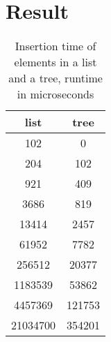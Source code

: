 \documentclass[a4paper,11pt]{article}
\begin{document}
\section{Result}

\begin{table}[h]
\begin{center}
\begin{tabular}{|c|c|}
\textbf{list} & \textbf{tree}\\
\hline
       102 &     0\\
      204 &     102\\
        921 &     409\\
       3686 &     819\\
      13414 &     2457\\
        61952 &     7782\\
      256512 &     20377\\
      1183539 &     53862\\
      4457369 &     121753\\
        21034700 &     354201\\
\end{tabular}
\caption{Insertion time of elements in a list and a tree, runtime in microseconds}
\label{tab:table1}
\end{center}
\end{table}
\end{document}

